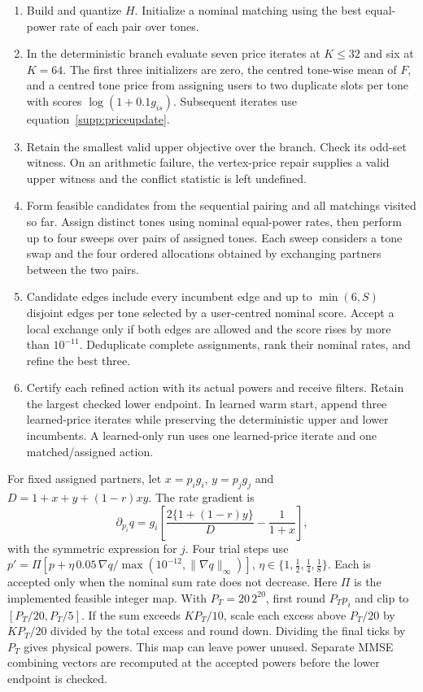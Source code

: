 \documentclass[10pt,letterpaper]{article}
\begin{document}
\begin{enumerate}
\item Build and quantize \(H\). Initialize a nominal matching using the
best equal-power rate of each pair over tones.
\item In the deterministic branch evaluate seven price iterates at \(K\le32\) and six
at \(K=64\). The first three initializers are zero, the centred tone-wise
mean of \(F\), and a centred tone price from assigning users to two duplicate
slots per tone with scores \(\log(1+0.1g_{is})\).
Subsequent iterates use equation~\eqref{supp:priceupdate}.
\item Retain the smallest valid upper objective over the branch. Check its
odd-set witness. On an arithmetic failure, the vertex-price repair supplies
a valid upper witness and the conflict statistic is left undefined.
\item Form feasible candidates from the sequential pairing and all matchings
visited so far. Assign distinct tones using nominal equal-power rates,
then perform up to four sweeps over pairs of assigned tones.
Each sweep considers a tone swap and the four ordered allocations obtained
by exchanging partners between the two pairs.
\item Candidate edges include every incumbent edge and up to
\(\min(6,S)\) disjoint edges per tone selected by a user-centred nominal score.
Accept a local exchange only if both edges are allowed and the score rises
by more than \(10^{-11}\). Deduplicate complete assignments, rank their
nominal rates, and refine the best three.
\item Certify each refined action with its actual powers and receive filters.
Retain the largest checked lower endpoint. In learned warm start, append
three learned-price iterates while preserving the deterministic upper and lower
incumbents. A learned-only run uses one learned-price iterate and one
matched/assigned action.
\end{enumerate}

For fixed assigned partners, let \(x=p_i g_i\), \(y=p_j g_j\) and
\(D=1+x+y+(1-r)xy\). The rate gradient is
\[
 \partial_{p_i}q=g_i\!\left[\frac{2\{1+(1-r)y\}}{D}
                  -\frac{1}{1+x}\right],
\]
with the symmetric expression for \(j\).
Four trial steps use
\(p'=\Pi[p+\eta\,0.05\,\nabla q/\max(10^{-12},\|\nabla q\|_\infty)]\),
\(\eta\in\{1,\tfrac12,\tfrac14,\tfrac18\}\).
Each is accepted only when the nominal sum rate does not decrease.
Here \(\Pi\) is the implemented feasible integer map. With
\(P_T=20\,2^{20}\), first round \(P_Tp_i\) and clip to
\([P_T/20,P_T/5]\). If the sum exceeds \(KP_T/10\), scale each excess
above \(P_T/20\) by \(KP_T/20\) divided by the total excess and round
down. Dividing the final ticks by \(P_T\) gives physical powers.
This map can leave power unused. Separate MMSE combining vectors
are recomputed at the accepted powers before the lower endpoint is checked.
\end{document}
